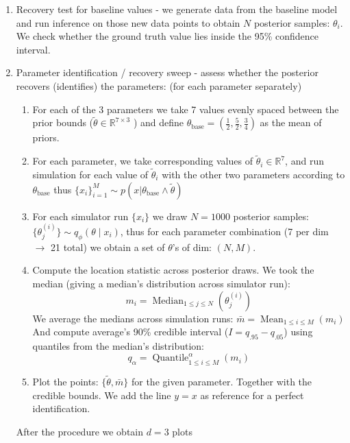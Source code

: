 \documentclass[12pt]{article}
\begin{document}
\begin{enumerate}

    \item Recovery test for baseline values - we generate data from the baseline model and run inference on those new data points to obtain $N$  posterior samples: $\theta_i$. We check whether the ground truth value lies inside the 95\% confidence interval. 

    \item Parameter identification / recovery sweep - assess whether the posterior recovers (identifies) the parameters: (for each parameter separately)
    \begin{enumerate}
        \item [i. ] For each of the 3 parameters we take 7 values evenly spaced between the prior bounds ($\tilde{\theta} \in \mathbb{R}^{7 \times 3}$ ) and define $\theta_\text{base} = (\frac{1}{2}, \frac{5}{2}, \frac{3}{4})$ as the mean of priors. 
        \item [ii. ] For each parameter, we take corresponding values of $\tilde{\theta}_i \in \mathbb{R}^7$, and run simulation for each value of $\tilde{\theta}_i$ with the other two parameters according to $\theta_\text{base}$ thus $\{x_i \}_{i =1}^M \sim p(x|\theta_\text{base} \land \tilde{\theta})$
        \item [iii. ] For each simulator run $\{ x_i \}$ we draw $N = 1000$ posterior samples: $\{ \theta^{(i)}_j \} \sim q_\phi(\theta \mid x_i)$, thus for each parameter combination (7 per dim $\rightarrow $ 21 total) we obtain a set of $\theta$'s of dim: $(N, M)$.
        \item [iv. ] Compute the location statistic across posterior draws. We took the median (giving a median's distribution across simulator run):
        \begin{equation}
            m_i = \operatorname{Median}_{1 \leq j \leq N} \left( \theta^{(i)}_j \right)
        \end{equation}
        We average the medians across simulation runs: $\bar{m} = \operatorname{Mean}_{1 \leq i \leq M}\left( m_i \right)$
        And compute average's  90\% credible interval ($I = q_{.95} - q_{.05}$) using quantiles from the median's distribution:
        \begin{equation}
            q_\alpha= \operatorname{Quantile}^\alpha_{1 \leq i \leq M} \left(m_i  \right)
        \end{equation}
        
        \item [v. ] Plot the points: $\{ \tilde{\theta},  \bar{m}\}$ for the given parameter. Together with the credible bounds. We add the line $y = x$ as reference for a perfect identification.
    \end{enumerate}
    After the procedure we obtain $d = 3$ plots
    

\end{enumerate}
\end{document}
